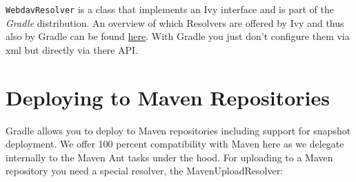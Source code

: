 \texttt{WebdavResolver} is a class that implements an Ivy interface and is part of the \emph{Gradle} distribution. An overview of which Resolvers are offered by Ivy and thus also by Gradle can be found \href{http://ant.apache.org/ivy/latest-milestone/configuration/resolvers.html}{here}. With Gradle you just don't configure them via xml but directly via there API.

\section{Deploying to Maven Repositories} %
\label{sec:deploying_to_maven_repositories}
Gradle allows you to deploy to Maven repositories including support for snapshot deployment. We offer 100 percent compatibility with Maven here as we delegate internally to the Maven Ant tasks under the hood. For uploading to a Maven repository you need a special resolver, the MavenUploadResolver:




